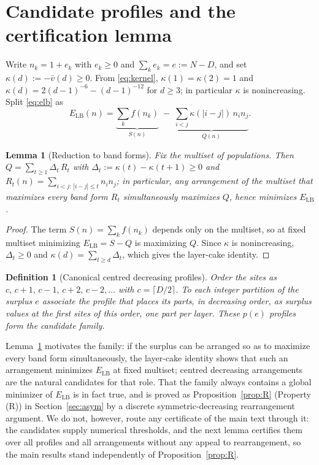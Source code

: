 \documentclass[11pt]{article}
\newtheorem{lemma}{Lemma}
\newtheorem{definition}{Definition}
\theoremstyle{remark}
\newcommand{\LB}{\mathrm{LB}}
\begin{document}
\section{Candidate profiles and the certification lemma}\label{sec:candidates}

Write $n_k=1+e_k$ with $e_k\ge0$ and $\sum_k e_k = e := N-D$, and set $\kappa(d):=-\bar v(d)\ge0$. From \eqref{eq:kernel}, $\kappa(1)=\kappa(2)=1$ and $\kappa(d)=2(d-1)^{-6}-(d-1)^{-12}$ for $d\ge3$; in particular $\kappa$ is nonincreasing. Split \eqref{eq:elb} as
\begin{equation}\label{eq:split}
E_\LB(n) = \underbrace{\sum_k f(n_k)}_{S(n)} \;-\; \underbrace{\sum_{i<j}\kappa(|i-j|)\, n_i n_j}_{Q(n)}.
\end{equation}

\begin{lemma}[Reduction to band forms]\label{lem:band}
Fix the multiset of populations. Then $Q=\sum_{t\ge1}\Delta_t\,R_t$ with $\Delta_t:=\kappa(t)-\kappa(t+1)\ge0$ and $R_t(n)=\sum_{i<j:\,|i-j|\le t} n_i n_j$; in particular, any arrangement of the multiset that maximizes every band form $R_t$ simultaneously maximizes $Q$, hence minimizes $E_\LB$.
\end{lemma}

\begin{proof}
The term $S(n)=\sum_k f(n_k)$ depends only on the multiset, so at fixed multiset minimizing $E_\LB=S-Q$ is maximizing $Q$. Since $\kappa$ is nonincreasing, $\Delta_t\ge0$ and $\kappa(d)=\sum_{t\ge d}\Delta_t$, which gives the layer-cake identity.
\end{proof}

\begin{definition}[Canonical centred decreasing profiles]\label{def:canonical}
Order the sites as $c,\,c+1,\,c-1,\,c+2,\,c-2,\dots$ with $c=\lceil D/2\rceil$. To each integer partition of the surplus $e$ associate the profile that places its parts, in decreasing order, as surplus values at the first sites of this order, one part per layer. These $p(e)$ profiles form the candidate family.
\end{definition}

Lemma~\ref{lem:band} motivates the family: if the surplus can be arranged so as to maximize every band form simultaneously, the layer-cake identity shows that such an arrangement minimizes $E_\LB$ at fixed multiset; centred decreasing arrangements are the natural candidates for that role. That the family always contains a global minimizer of $E_\LB$ is in fact true, and is proved as Proposition~\ref{prop:R} (Property (R)) in Section~\ref{sec:asym} by a discrete symmetric-decreasing rearrangement argument. We do not, however, route any certificate of the main text through it: the candidates supply numerical thresholds, and the next lemma certifies them over all profiles and all arrangements without any appeal to rearrangement, so the main results stand independently of Proposition~\ref{prop:R}.
\end{document}
